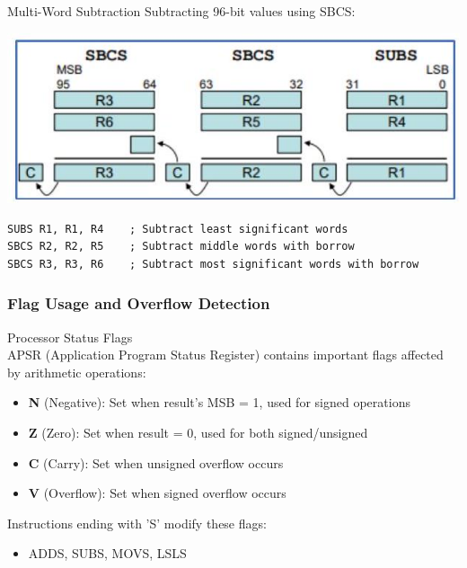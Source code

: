 \begin{example2}{Multi-Word Subtraction}
Subtracting 96-bit values using SBCS:

\includegraphics[width=\linewidth]{images/2024_12_29_79e6b22f503fb7b4f718g-04(1)}

\begin{lstlisting}[language=armasm, style=basesmol]
SUBS R1, R1, R4    ; Subtract least significant words
SBCS R2, R2, R5    ; Subtract middle words with borrow
SBCS R3, R3, R6    ; Subtract most significant words with borrow
\end{lstlisting}
\end{example2}

\subsubsection{Flag Usage and Overflow Detection}

\begin{concept}{Processor Status Flags}\\
APSR (Application Program Status Register) contains important flags affected by arithmetic operations:
\begin{itemize}
  \item \textbf{N} (Negative): Set when result's MSB = 1, used for signed operations
  \item \textbf{Z} (Zero): Set when result = 0, used for both signed/unsigned
  \item \textbf{C} (Carry): Set when unsigned overflow occurs
  \item \textbf{V} (Overflow): Set when signed overflow occurs
\end{itemize}

Instructions ending with 'S' modify these flags:
\begin{itemize}
  \item ADDS, SUBS, MOVS, LSLS
\end{itemize}
\end{concept}

